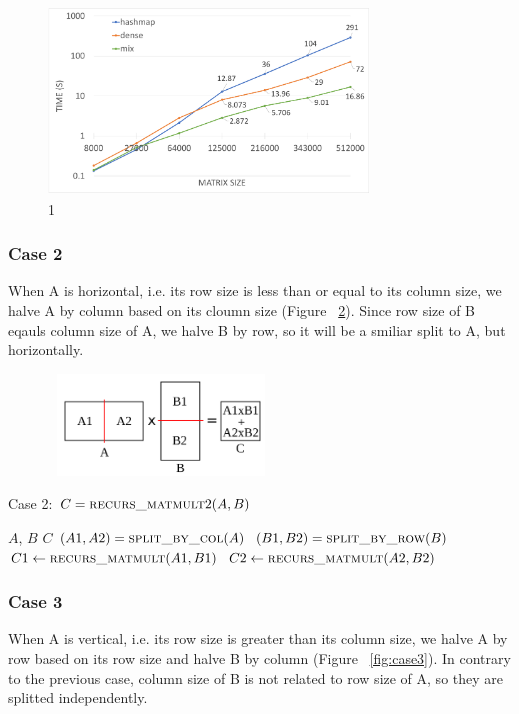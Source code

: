 \begin{figure}[tbh]
 \centering
 \includegraphics[width=8.5cm,height=5cm]{./figures/mix.pdf}
 \caption{1}
 \label{fig:mix}
\end{figure}


\subsubsection{Case 2}
\label{sec:case2}
When A is horizontal, i.e. its row size is less than or equal to its column size, we halve A by column based on its cloumn size (Figure ~\ref{fig:case2}). Since row size of B eqauls column size of A, we halve B by row, so it will be a smiliar split to A, but horizontally. 

\begin{figure}[tbh]
 \centering
 \includegraphics[width=6cm,height=2.7cm]{./figures/case2_001.pdf}
 \caption{}
 \label{fig:case2}
\end{figure}

\begin{algorithm}[H] 
  \caption{Case 2: $C = \textsc{recurs\_matmult}2(A, B)$} \label{alg:case2} 
  \begin{algorithmic}[1]
    \Require $A$, $B$
    \Ensure  $C$
    \State $(A1, A2) = \textsc{split\_by\_col}(A)$
    \State $(B1, B2) = \textsc{split\_by\_row}(B)$
    \State $C1 \leftarrow \textsc{recurs\_matmult}(A1,B1)$
    \State $C2 \leftarrow \textsc{recurs\_matmult}(A2,B2)$
  \end{algorithmic}
\end{algorithm}

\subsubsection{Case 3}
\label{sec:case3}
When A is vertical, i.e. its row size is greater than its column size, we halve A by row based on its row size and halve B by column (Figure ~\ref{fig:case3}). In contrary to the previous case, column size of B is not related to row size of A, so they are splitted independently.

